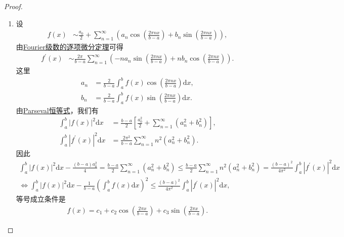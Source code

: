\documentclass[../../main.tex]{subfiles}%
\begin{document}
\begin{proof}
\begin{enumerate}[(1)]
\item 设
\begin{align*}
f(x) &\sim \frac{a_0}{2}+\sum_{n = 1}^{\infty}\left(a_n\cos\left(\frac{2\pi nx}{b - a}\right)+b_n\sin\left(\frac{2\pi nx}{b - a}\right)\right),
\end{align*}
由\hyperref[theorem:Fourier级数的逐项微分定理]{Fourier级数的逐项微分定理}可得
\begin{align*}
f^{\prime}(x) &\sim \frac{2\pi}{b - a}\sum_{n = 1}^{\infty}\left(-na_n\sin\left(\frac{2\pi nx}{b - a}\right)+nb_n\cos\left(\frac{2\pi nx}{b - a}\right)\right).
\end{align*}
这里
\begin{align*}
a_n&=\frac{2}{b - a}\int_{a}^{b}f(x)\cos\left(\frac{2\pi nx}{b - a}\right)\mathrm{d}x,\\
b_n&=\frac{2}{b - a}\int_{a}^{b}f(x)\sin\left(\frac{2\pi nx}{b - a}\right)\mathrm{d}x.
\end{align*}
由\hyperref[theorem:Parseval恒等式]{Parseval恒等式}，我们有
\begin{align*}
\int_{a}^{b}|f(x)|^2\mathrm{d}x&=\frac{b - a}{2}\left[\frac{a_0^2}{2}+\sum_{n = 1}^{\infty}(a_n^2 + b_n^2)\right],\\
\int_{a}^{b}|f^{\prime}(x)|^2\mathrm{d}x&=\frac{2\pi^2}{b - a}\sum_{n = 1}^{\infty}n^2(a_n^2 + b_n^2).
\end{align*}
因此
\begin{gather*}
\int_a^b{|f(x)|^2\mathrm{d}x}-\frac{\left( b-a \right) a_{0}^{2}}{4}=\frac{b-a}{2}\sum_{n=1}^{\infty}{\left( a_{n}^{2}+b_{n}^{2} \right)}\leqslant \frac{b-a}{2}\sum_{n=1}^{\infty}{n^2\left( a_{n}^{2}+b_{n}^{2} \right)}=\frac{(b-a)^2}{4\pi ^2}\int_a^b{|f^{\prime}(x)|^2\mathrm{d}x}
\\
\Longleftrightarrow \int_a^b{|f(x)|^2\mathrm{d}x}-\frac{1}{b-a}\left( \int_a^b{f(x)\mathrm{d}x} \right) ^2\leqslant \frac{(b-a)^2}{4\pi ^2}\int_a^b{|f^{\prime}(x)|^2\mathrm{d}x},
\end{gather*}
等号成立条件是
\begin{align*}
f(x)=c_1 + c_2\cos\left(\frac{2\pi x}{b - a}\right)+c_3\sin\left(\frac{2\pi x}{b - a}\right).
\end{align*}


\end{enumerate}
\end{proof}
\end{document}
